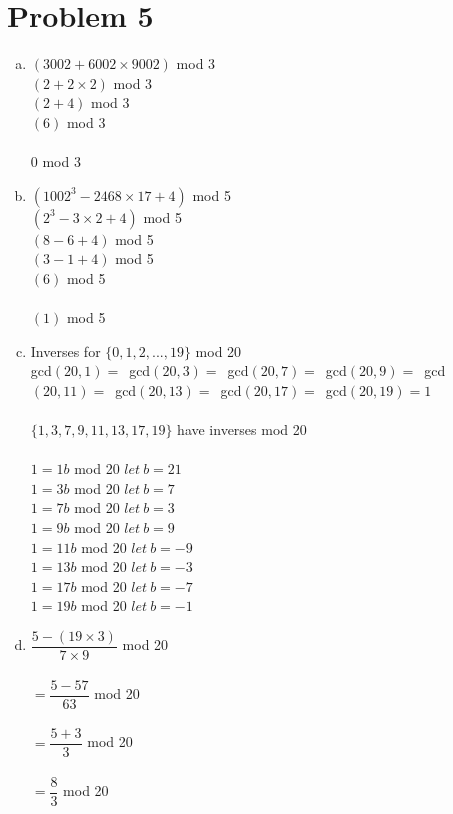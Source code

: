 \documentclass[11pt,letterpaper]{article}
\begin{document}
\section*{Problem 5}
\begin{enumerate}[(a)]
\item
$(3002+6002\times9002)$ mod 3\\
$(2+2\times2)$ mod 3\\
$(2+4)$ mod 3\\
$(6)$ mod 3\\
\\
$0$ mod 3\\
\item
$(1002^3-2468\times17+4)$ mod 5\\
$(2^3-3\times2+4)$ mod 5\\
$(8-6+4)$ mod 5\\
$(3-1+4)$ mod 5\\
$(6)$ mod 5\\
\\
$(1)$ mod 5\\
\item
Inverses for $\{0,1,2,... ,19\}$ mod 20\\
gcd$(20,1)=$\
gcd$(20,3)=$\
gcd$(20,7)=$\
gcd$(20,9)=$\
gcd$(20,11)=$\
gcd$(20,13)=$\
gcd$(20,17)=$\
gcd$(20,19)=1$\\
\\
$\{1,3,7,9,11,13,17,19\}$ have inverses mod 20\\
\\
$1 = 1b$ mod 20 $let~ b =21$\\
$1=3b$ mod 20 $let~ b =7$\\
$1=7b$ mod 20 $let~ b =3$\\
$1=9b$ mod 20 $let~ b =9$\\
$1=11b$ mod 20 $let~ b =-9$\\
$1=13b$ mod 20 $let~ b =-3$\\
$1=17b$ mod 20 $let~ b =-7$\\
$1=19b$ mod 20 $let~ b =-1$\\
\clearpage
\item
$\dfrac{5-(19\times3)}{7\times9}$ mod 20\\
\\
$=\dfrac{5-57}{63}$ mod 20\\
\\
$=\dfrac{5+3}{3}$ mod 20\\
\\
$=\dfrac{8}{3}$ mod 20\\
\\

\end{enumerate}
\end{document}
